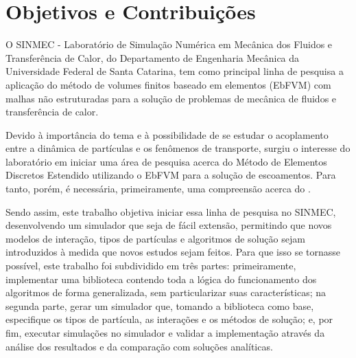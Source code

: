 \section{Objetivos e Contribuições} \label{sec:objectives_and_contributions}

O SINMEC - Laboratório de Simulação Numérica em Mecânica dos Fluidos e Transferência de Calor, do Departamento de Engenharia Mecânica da Universidade Federal de Santa Catarina, tem como principal linha de pesquisa a aplicação do método de volumes finitos baseado em elementos (EbFVM) com malhas não estruturadas para a solução de problemas de mecânica de fluidos e transferência de calor.

Devido à importância do tema e à possibilidade de se estudar o acoplamento entre a dinâmica de partículas e os fenômenos de transporte, surgiu o interesse do laboratório em iniciar uma área de pesquisa acerca do Método de Elementos Discretos Estendido utilizando o EbFVM para a solução de escoamentos. Para tanto, porém, é necessária, primeiramente, uma compreensão acerca do \DEM{}.

Sendo assim, este trabalho objetiva iniciar essa linha de pesquisa no SINMEC, desenvolvendo um simulador que seja de fácil extensão, permitindo que novos modelos de interação, tipos de partículas e algoritmos de solução sejam introduzidos à medida que novos estudos sejam feitos. Para que isso se tornasse possível, este trabalho foi subdividido em três partes: primeiramente, implementar uma biblioteca contendo toda a lógica do funcionamento dos algoritmos \DEM{} de forma generalizada, sem particularizar suas características; na segunda parte, gerar um simulador que, tomando a biblioteca como base, especifique os tipos de partícula, as interações e os métodos de solução; e, por fim, executar simulações no simulador e validar a implementação através da análise dos resultados e da comparação com soluções analíticas. 
 
